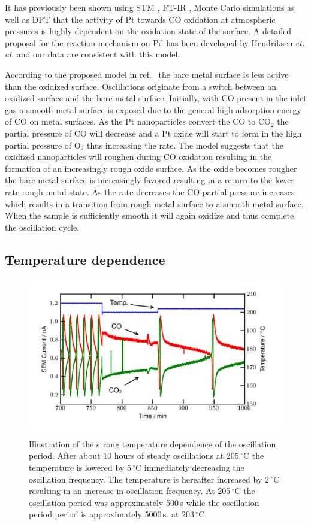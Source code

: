 \documentclass[journal=jacsat,manuscript=article]{achemso}
\begin{document}
It has previously been shown using STM \cite{Hendriksen2002}, FT-IR
\cite{Carlsson2006}, Monte Carlo simulations \cite{Zhdanov2002} as well as DFT
\cite{Gong2004} that the activity of Pt towards CO oxidation at atmospheric
pressures is highly dependent on the oxidation state of the surface. A detailed
proposal for the reaction mechanism on Pd has been developed by Hendriksen
\textit{et. al.}\cite{Hendriksen2010} and our data are consistent with this
model.

According to the proposed model in ref.~ the bare metal
surface is less active than the oxidized surface. Oscillations originate from a
switch between an oxidized surface and the bare metal surface. Initially, with
CO present in the inlet gas a smooth metal surface is exposed due to the
general high adsorption energy of CO on metal surfaces. As the Pt nanoparticles
convert the CO to CO$_2$ the partial pressure of CO will decrease and a Pt
oxide will start to form in the high partial pressure of O$_2$ thus increasing
the rate. The model\cite{Hendriksen2010} suggests that the oxidized
nanoparticles will roughen during CO oxidation resulting in the formation of an
increasingly rough oxide surface. As the oxide becomes rougher the bare metal
surface is increasingly favored resulting in a return to the lower rate rough
metal state. As the rate decreases the CO partial pressure increases which
results in a transition from rough metal surface to a smooth metal surface.
When the sample is sufficiently smooth it will again oxidize and thus complete
the oscillation cycle.

\subsection{Temperature dependence}
\begin{figure}
\includegraphics[width=12cm]{temperature_dependence.png}
\caption{Illustration of the strong temperature dependence of the oscillation period. After about 10
  hours of steady oscillations at 205\,$^\circ$C the temperature is lowered by
  5\,$^\circ$C immediately decreasing the oscillation frequency. The temperature
  is hereafter increased by 2\,$^\circ$C resulting in an increase in oscillation
  frequency. At 205\,$^\circ$C the oscillation period was approximately 500\,s
  while the oscillation period period is approximately 5000\,s. at
  203\,$^\circ$C.
  \label{fgr:temperature_dependence}
}
\end{figure}
\end{document}
